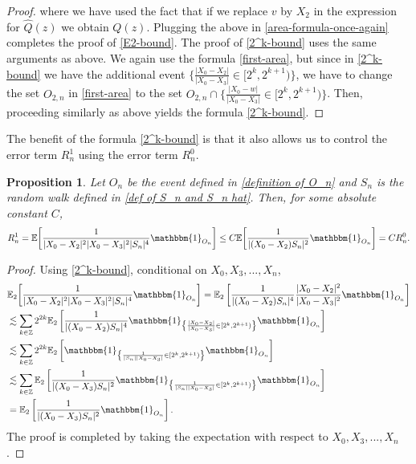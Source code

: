 \documentclass[9pt,a4paper,reqno]{amsart}
\theoremstyle{mine}
\newtheorem{prop}[thm]{Proposition}
\theoremstyle{definition}
\theoremstyle{remark}
\newcommand{\mb}{\mathbb}
\begin{document}
\begin{proof}
where we have used the fact that if we replace $v$ by $X_2$ in the expression for $\widehat{Q}(z)$ we obtain $Q(z)$. Plugging the above in \eqref{area-formula-once-again} completes the proof of \eqref{E2-bound}. The proof of \eqref{2^k-bound} uses the same arguments as above. We again use the formula \eqref{first-area}, but since in \eqref{2^k-bound} we have the additional event $\{\frac{|X_0 -X_2|}{|X_0 - X_3|} \in [2^k, 2^{k+1})\}$, we have to change the set $O_{2,n}$ in \eqref{first-area} to the set $O_{2,n} \cap \{\frac{|X_0 -w|}{|X_0 - X_3|} \in [2^k, 2^{k+1})\}$. Then, proceeding similarly as above yields the formula \eqref{2^k-bound}. 
\end{proof}


The benefit of the formula \eqref{2^k-bound} is that it also allows us to control the error term $R_n^1$ using the error term $R_n^0$.

\begin{prop} \label{R_1< R_0}Let $O_n$ be the event defined in \eqref{definition of O_n} and $S_n$ is the random walk defined in \eqref{def of S_n and S_n hat}. Then, for some absolute constant $C$, 
   \begin{align}
         R_n^1 = \mathbb{E}\biggl[\frac{1}{|X_0-X_2|^2|X_0-X_3|^2|S_n|^4} \mathbbm{1}_{O_n}\biggr] \leq C\mb{E}\biggl[\frac{1}{|(X_0-X_2)S_n|^2} \mathbbm{1}_{O_n}\biggr] = C R_{n}^0.
   \end{align}
\end{prop}

\begin{proof}
    Using \eqref{2^k-bound}, conditional on $X_0, X_3, ..., X_n$, 
 \begin{align*}
         &\mathbb{E}_2\biggl[\frac{1}{|X_0-X_2|^2|X_0-X_3|^2|S_n|^4} \mathbbm{1}_{O_n}\biggr] = \mathbb{E}_2\left[ \frac{1}{|(X_0-X_2)S_n|^4}\frac{|X_0-X_2|^2}{|X_0-X_3|^2} \mathbbm{1}_{O_n} \right]\\
         &\lesssim \sum_{k \in \mb{Z}} 2^{2k} \mathbb{E}_2\left[ \frac{1}{|(X_0-X_2)S_n|^4} \mathbbm{1}_{ \left \{\frac{|X_0-X_2|}{|X_0-X_3|} \in [2^k,2^{k+1}) \right \}}\mathbbm{1}_{O_n} \right]\\
         &\lesssim \sum_{k \in \mb{Z}}2^{2k} \mathbb{E}_2\left[ \mathbbm{1}_{ \left \{\frac{1}{|S_n||X_0-X_3|} \in [2^k,2^{k+1}) \right \}}\mathbbm{1}_{O_n} \right]\\
         &\lesssim \sum_{k \in \mb{Z}}\mathbb{E}_2\left[ \frac{1}{|(X_0-X_3)S_n|^2}\mathbbm{1}_{ \left \{\frac{1}{|S_n||X_0-X_3|} \in [2^k,2^{k+1}) \right \}}\mathbbm{1}_{O_n} \right] \\
         & = \mathbb{E}_2\left[ \frac{1}{|(X_0-X_3)S_n|^2}\mathbbm{1}_{O_n} \right].
     \end{align*}
     The proof is completed by taking the expectation with respect to $X_0, X_3, ..., X_n$. 
\end{proof}
\end{document}
